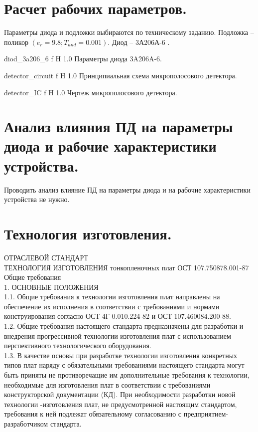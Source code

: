 \documentclass{bmstu}
\begin{document}
	\chapter{Расчет рабочих параметров.}
	
	\indent	Параметры диода и подложки выбираются по техническому заданию. Подложка – 
	поликор $(e_r = 9.8; T_{and} = 0.001)$. Диод – 3А206А-6 \cite{9}.
	
	{diod_3a206_6}
	{f} %
	{H} %
	{1.0\textwidth} %
	{Параметры диода 3A206A-6.} %
	
	{detector_circuit}
	{f} %
	{H} %
	{1.0\textwidth} %
	{Принципиальная схема микрополосового детектора.} %
	
	{detector_IC}
	{f} %
	{H} %
	{1.0\textwidth} %
	{Чертеж микрополосового детектора.} %
	
	\chapter{Анализ влияния ПД на параметры диода и рабочие характеристики устройства.}
	
	Проводить анализ влияние ПД на параметры диода и на рабочие характеристики устройства не нужно.
	
	\chapter{Технология изготовления.} 
	
	   ОТРАСЛЕВОЙ   СТАНДАРТ \\
	ТЕХНОЛОГИЯ ИЗГОТОВЛЕНИЯ тонкопленочных плат     ОСТ 107.750878.001-87\\
	Общие требования \\
	1. ОСНОВНЫЕ ПОЛОЖЕНИЯ \\
	1.1. Общие требования к технологии изготовления плат направлены на обеспечение их исполнения в соответствии с требованиями и нормами конструирования согласно ОСТ 4Г 0.010.224-82 и ОСТ 107.460084.200-88. \\
	1.2. Общие требования настоящего стандарта предназначены для разработки и внедрения прогрессивной технологии изготовления плат с использованием перспективного технологического оборудования. \\
	1.3. В качестве основы при разработке технологии изготовления конкретных типов плат наряду с обязательными требованиями настоящего стандарта могут быть приняты не противоречащие им дополнительные требования к технологии, необходимые для изготовления плат в соответствии с требованиями конструкторской документации (КД).
	При необходимости разработки новой технологии -изготовления плат, не предусмотренной настоящим стандартом, требования к ней подлежат обязательному согласованию с предприятием-разработчиком стандарта. \\
	
\end{document}
